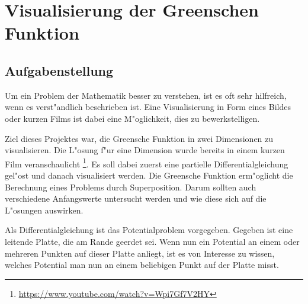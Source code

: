 \chapter{Visualisierung der Greenschen Funktion\label{chapter:green}}
\begin{refsection}

\section{Aufgabenstellung}
Um ein Problem der Mathematik besser zu verstehen, ist es oft sehr
hilfreich, wenn es verst"andlich beschrieben ist. Eine Visualisierung
in Form eines Bildes oder kurzen Films ist dabei eine M"oglichkeit,
dies zu bewerkstelligen.
	
Ziel dieses Projektes war, die Greensche Funktion in zwei Dimensionen
zu visualisieren. Die L"osung f"ur eine Dimension wurde bereits in
einem kurzen Film veranschaulicht
\footnote{\url{https://www.youtube.com/watch?v=Wpi7Gf7V2HY}}. Es
soll dabei zuerst eine partielle Differentialgleichung gel"ost und
danach visualisiert werden. Die Greensche Funktion erm"oglicht die
Berechnung eines Problems durch Superposition. Darum sollten auch
verschiedene Anfangswerte untersucht werden und wie diese sich auf
die L"osungen auswirken.
	
Als Differentialgleichung ist das Potentialproblem vorgegeben.
Gegeben ist eine leitende Platte, die am Rande geerdet sei. Wenn
nun ein Potential an einem oder mehreren Punkten auf dieser Platte
anliegt, ist es von Interesse zu wissen, welches Potential man nun
an einem beliebigen Punkt auf der Platte misst.


\end{refsection}
